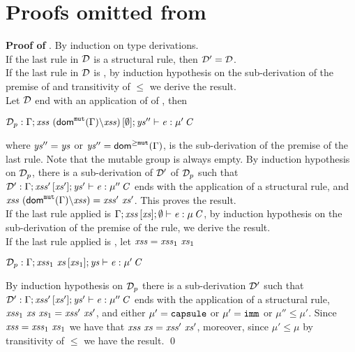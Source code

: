 \section{Proofs omitted from }\label{app:proofs}
%
\label{sect:proof-cf}

\noindent
{\bf Proof of }.
By induction on type derivations.\\
If the last rule in ${\cal D}$ is a structural rule, then   ${\cal D}'={\cal D}$.\\
If the last rule in ${\cal D}$ is , by induction hypothesis on 
the sub-derivation of the premise of  and transitivity of $\leq$ we derive the result.\\
Let ${\cal D}$ end with an application of  of , then
\begin{center}
$
\deriv_p:\AuxTypeCheck{{\Gamma}}{\LentLocked\ (\domMut{\Gamma}{\setminus}\LentLocked)}{\emptyset}{\StronglyLocked''}{\e}{\Type{\mu'}{\C}}
$
\end{center}
where $\mathit{ys}''=\mathit{ys}$ or $\mathit{ys}''={\textsf{dom}^{\geq\texttt{mut}}}(\Gamma)$, is the sub-derivation of the premise of the last rule. Note that the mutable group is always empty. By induction hypothesis on 
${\cal D}_p$, there is a sub-derivation of ${\cal D}'$ of ${\cal D}_p$
such that ${\cal D}':{\Gamma};\mathit{xss}'\,[\mathit{xs}'];\mathit{ys}'\vdash \mathit{e}:\mu''\,\mathit{C}$ ends with the application of a structural rule, and 
$\LentLocked\ (\domMut{\Gamma}{\setminus}\LentLocked)=\LentLocked'\ \MutGroup'$. This proves the result. \\
If the last rule applied is  
${\Gamma};\mathit{xss}\,[\mathit{xs}];\emptyset\vdash \mathit{e}:\mu\,\mathit{C}$, by induction hypothesis on 
the sub-derivation of the premise of the rule, we derive the result. \\
If the last rule applied is ,  let $\LentLocked=\LentLocked_1\ \xs_1$ 
\begin{center}
$\deriv_p:\AuxTypeCheck{\Gamma}{\LentLocked_1\ \xs}{\MutGroup_1}{\StronglyLocked}{\e}{\Type{\mu'}{\C}}$
\end{center}
By induction hypothesis on ${\cal D}_p$ there is a sub-derivation ${\cal D}'$
such that ${\cal D}':{\Gamma};\mathit{xss}'\,[\mathit{xs}'];\mathit{ys}'\vdash \mathit{e}:\mu''\,\mathit{C}$ ends with the application of a structural rule,  
 $\LentLocked_1\ \xs\ \xs_1=\LentLocked'\ \xs'$, and either $\mu'=\texttt{capsule}$ or $\mu'=\texttt{imm}$ or $\mu''\leq\mu'$. Since $\LentLocked=\LentLocked_1\ \xs_1$
 we have that $\LentLocked\ \xs=\LentLocked'\ \xs'$, moreover, since $\mu'\leq\mu$ by transitivity of 
 $\leq$ we have the result. \qed

